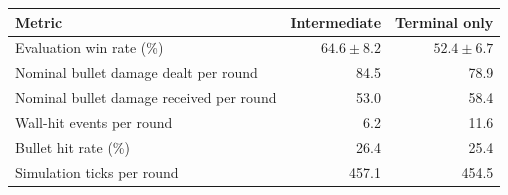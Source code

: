 \begin{tabular}{lrr}
\toprule
Metric & Intermediate & Terminal only \\
\midrule
Evaluation win rate (\%) & $64.6 \pm 8.2$ & $52.4 \pm 6.7$ \\
Nominal bullet damage dealt per round & 84.5 & 78.9 \\
Nominal bullet damage received per round & 53.0 & 58.4 \\
Wall-hit events per round & 6.2 & 11.6 \\
Bullet hit rate (\%) & 26.4 & 25.4 \\
Simulation ticks per round & 457.1 & 454.5 \\
\bottomrule
\end{tabular}
